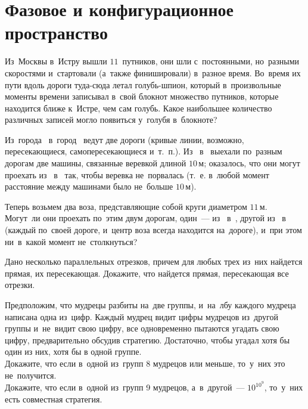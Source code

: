
\section*{Фазовое и конфигурационное пространство}


\begin{problems}

\item
Из~Москвы в~Истру вышли $11$~путников, они шли с~постоянными, но~разными
скоростями и~стартовали (а~также финишировали) в~разное время.
Во~время их пути вдоль дороги туда-сюда летал голубь-шпион, который
в~произвольные моменты времени записывал в~свой блокнот множество путников,
которые находится ближе к~Истре, чем сам голубь.
Какое наибольшее количество различных записей могло появиться у~голубя
в~блокноте?

\item
Из~города~ в~город~ ведут две дороги
(кривые линии, возможно, пересекающиеся, самопересекающиеся и~т.~п.).
Из~ в~ выехали по~разным дорогам две машины, связанные веревкой
длиной $10\,\text{м}$;
оказалось, что они могут проехать из~ в~ так, чтобы веревка
не~порвалась
(т.~е. в~любой момент расстояние между машинами было не~больше $10\,\text{м}$).
\par
Теперь возьмем два воза, представляющие собой круги диаметром $11\,\text{м}$.
Могут~ли они проехать по~этим двум дорогам, один~--- из~ в~,
другой из~ в~
(каждый по~своей дороге, и~центр воза всегда находится на~дороге),
и~при этом ни~в~какой момент не~столкнуться?

\item
Дано несколько параллельных отрезков, причем для любых трех из~них найдется
прямая, их пересекающая.
Докажите, что найдется прямая, пересекающая все отрезки.

\item
Предположим, что мудрецы разбиты на~две группы, и~на~лбу каждого мудреца
написана одна из~цифр.
Каждый мудрец видит цифры мудрецов из~другой группы и~не~видит свою цифру, все
одновременно пытаются угадать свою цифру, предварительно обсудив стратегию.
Достаточно, чтобы угадал хотя бы один из них, хотя бы в одной группе.
\\
\subproblem
Докажите, что если в~одной из~групп 8 мудрецов или меньше, то~у~них это
не~получится.
\\
\subproblem
Докажите, что если в~одной из~групп 9 мудрецов, а~в~другой~--- $10^{10^9}$,
то~у~них есть совместная стратегия.

\end{problems}

